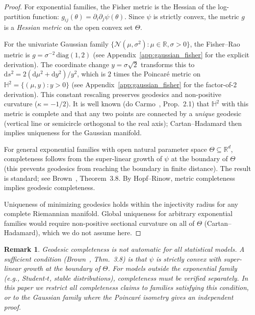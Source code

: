 \documentclass[a4paper,fleqn]{cas-dc}
\newtheorem{remark}{Remark}
\newcommand{\R}{\mathbb{R}}
\begin{document}
\begin{proof}
  For exponential families, the Fisher metric is the Hessian of the
  log-partition function: $g_{ij}(\theta) = \partial_i\partial_j\psi(\theta)$.
  Since $\psi$ is strictly convex, the metric $g$ is a \emph{Hessian
  metric} on the open convex set $\Theta$.

  For the univariate Gaussian family $\{\mathcal{N}(\mu,\sigma^2):\mu\in\R,\sigma>0\}$,
  the Fisher--Rao metric is $g = \sigma^{-2}\,\mathrm{diag}(1,2)$
  (see Appendix~\ref{app:gaussian_fisher} for the explicit derivation).
  The coordinate change $y=\sigma\sqrt{2}$ transforms this to
  $\mathrm{d}s^2 = 2(\mathrm{d}\mu^2+\mathrm{d}y^2)/y^2$,
  which is $2$ times the Poincar\'{e} metric on $\mathbb{H}^2=\{(\mu,y):y>0\}$
  (see Appendix~\ref{app:gaussian_fisher} for the factor-of-2 derivation).
  This constant rescaling preserves geodesics and non-positive curvature
  ($\kappa = -1/2$).
  It is well known (do Carmo~\cite{do2002riemannian}, Prop.~2.1) that
  $\mathbb{H}^2$ with this metric is complete and that any two points are
  connected by a \emph{unique} geodesic (vertical line or semicircle
  orthogonal to the real axis); Cartan--Hadamard then implies uniqueness
  for the Gaussian manifold.

  For general exponential families with open natural parameter space
  $\Theta \subseteq \R^d$, completeness follows from the super-linear
  growth of $\psi$ at the boundary of $\Theta$ (this prevents geodesics
  from reaching the boundary in finite distance).
  The result is standard; see Brown~\cite{brown1986fundamentals},
  Theorem~3.8.  By Hopf--Rinow, metric completeness implies geodesic
  completeness.

  Uniqueness of minimizing geodesics holds within the injectivity radius
  for any complete Riemannian manifold.  Global uniqueness for arbitrary
  exponential families would require non-positive sectional curvature on
  all of $\Theta$ (Cartan--Hadamard), which we do not assume here.
\end{proof}

\begin{remark}%
  \label{rem:completeness_general}
  Geodesic completeness is not automatic for all statistical models.
  A sufficient condition (Brown~\cite{brown1986fundamentals}, Thm.~3.8)
  is that $\psi$ is strictly convex with super-linear growth at the
  boundary of $\Theta$.
  For models outside the exponential family (e.g., Student-$t$, stable
  distributions), completeness must be verified separately.
  In this paper we restrict all completeness claims to families satisfying
  this condition, or to the Gaussian family where the Poincar\'{e}
  isometry gives an independent proof.
\end{remark}
\end{document}
